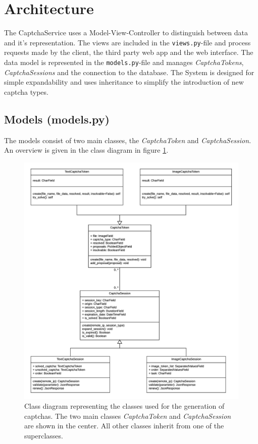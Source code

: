 \section{Architecture}
\label{sec:architecture}

The CaptchaService uses a Model-View-Controller to distinguish between data and it's representation. The views are included in the \verb|views.py|-file and process requests made by the client, the third party web app and the web interface. 
The data model is represented in the \verb|models.py|-file and manages \emph{CaptchaTokens}, \emph{CaptchaSessions} and the connection to the database.
The System is designed for simple expandability and uses inheritance to simplify the introduction of new captcha types. 

\subsection{Models (models.py)}

The models consist of two main classes, the \emph{CaptchaToken} and \emph{CaptchaSession}. An overview is given in the class diagram in figure \ref{fig:classdia}. 

\begin{figure}[!h]
\centering
\includegraphics[width=1.1\linewidth]{content/figures/classdiagramm.png}
\caption{Class diagram representing the classes used for the generation of captchas. The two main classes \emph{CaptchaToken} and \emph{CaptchaSession} are shown in the center. All other classes inherit from one of the superclasses.
}
\label{fig:classdia}
\end{figure}

